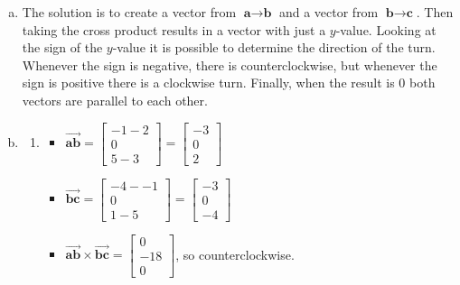 \documentclass[11pt]{article}
\begin{document}
\begin{enumerate}[a.]
	\item %
	The solution is to create a vector from $\textbf{a} \to \textbf{b}$ and a vector from $\textbf{b} \to \textbf{c}$. Then taking the cross product results in a vector with just a $y$-value. Looking at the sign of the $y$-value it is possible to determine the direction of the turn. Whenever the sign is negative, there is counterclockwise, but whenever the sign is positive there is a clockwise turn. Finally, when the result is $0$ both vectors are parallel to each other.
	\item %
	\begin{enumerate}[1.)]
		\item %
		\begin{itemize}
			\item $\vec{\textbf{ab}} = 
			\begin{bmatrix}
				-1-2 \\ 0 \\ 5-3
			\end{bmatrix}=
			\begin{bmatrix}
				-3 \\ 0 \\ 2
			\end{bmatrix}$
			\item $\vec{\textbf{bc}} = 
			\begin{bmatrix}
				-4--1 \\ 0 \\ 1-5
			\end{bmatrix}=
			\begin{bmatrix}
				-3 \\ 0 \\ -4
			\end{bmatrix}$
			\item $\vec{\textbf{ab}}\times\vec{\textbf{bc}} = 
			\begin{bmatrix}
				0 \\ -18 \\ 0
			\end{bmatrix}$, so counterclockwise.
		\end{itemize}
		

\end{enumerate}
\end{enumerate}
\end{document}
